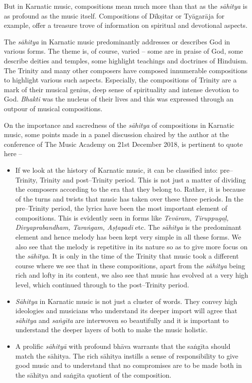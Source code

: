 But in Karnatic music, compositions mean much more than that as the \textit{sāhitya} is as profound as the music itself. Compositions of Dīkṣitar or Tyāgarāja for example, offer a treasure trove of information on spiritual and devotional aspects.

The \textit{sāhitya} in Karnatic music predominantly addresses or describes God in various forms. The theme is, of course, varied – some are in praise of God, some describe deities and temples, some highlight teachings and doctrines of Hinduism. The Trinity and many other composers have composed innumerable compositions to highlight various such aspects. Especially, the compositions of Trinity are a mark of their musical genius, deep sense of spirituality and intense devotion to God. \textit{Bhakti} was the nucleus of their lives and this was expressed through an outpour of musical compositions.

On the importance and sacredness of the \textit{sāhitya} of compositions in Karnatic music, some points made in a panel discussion chaired by the author at the conference of The Music Academy on 21st December 2018, is pertinent to quote here –

\begin{itemize}
\itemsep=0pt
\item If we look at the history of Karnatic music, it can be classified into: pre–Trinity, Trinity and post–Trinity period. This is not just a matter of dividing the composers according to the era that they belong to. Rather, it is because of the turns and twists that music has taken over these three periods. In the pre–Trinity period, the lyrics have been the most important element of compositions. This is evidently seen in forms like \textit{Tevāram, Tiruppugaḻ, Divyaprabandham, Taraṅgam, Aṣṭapadi} etc. The \textit{sāhitya} is the predominant element and hence melody has been kept very simple in all these forms. We also see that the melody is repetitive in its nature so as to give more focus on the \textit{sāhitya}. It is only in the time of the Trinity that music took a different course where we see that in these compositions, apart from the \textit{sāhitya} being rich and lofty in its content, we also see that music has evolved at a very high level, which continued through to the post–Trinity period.

 \item \textit{Sāhitya} in Karnatic music is not just a cluster of words. They convey high ideologies and musicians who understand its deeper import will agree that \textit{sāhitya} and \textit{saṅgīta} are interwoven so beautifully and it is important to understand the deeper layers of both to make the music holistic.

 \item A prolific \textit{sāhityā} with profound bhāva warrants that the saṅgīta should match the sāhitya. The rich sāhitya instills a sense of responsibility to give good music and to understand that no compromises are to be made both in the sāhitya and saṅgīta quotient of the composition.

\end{itemize}

